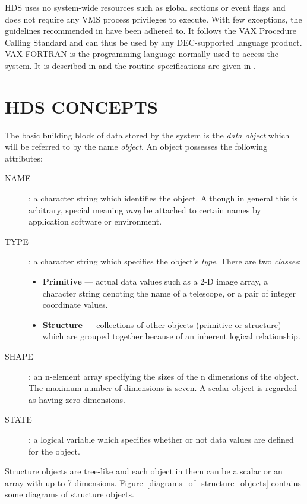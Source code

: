 HDS uses no system-wide resources such as global sections or event flags and
does not require any VMS process privileges to execute. With few exceptions,
the guidelines recommended in \cite{creating_modular_procedures} have been
adhered to. It follows the VAX Procedure Calling Standard and can thus be used
by any DEC-supported language product. VAX FORTRAN is the programming language
normally used to access the system. It is described in
\cite{programming_in_fortran} and the routine specifications are given in
\cite{sun_92}.

\section {HDS CONCEPTS}

The basic building block of data stored by the system is the {\em data object}
which will be referred to by the name {\em object}. An object possesses the
following attributes:

\begin {description}
\item [NAME]: a character string which identifies the object. Although in
general this is arbitrary, special meaning {\em may} be attached to certain
names by application software or environment.
\item [TYPE]: a character string which specifies the object's {\em type}.
There are two {\em classes}:
\begin {itemize}
\item {\bf Primitive} --- actual data values such as a 2-D image array, a
character string denoting the name of a telescope, or a pair of integer
coordinate values.
\item {\bf Structure} --- collections of other objects (primitive or structure)
which are grouped together because of an inherent logical relationship.
\end {itemize}
\item [SHAPE]: an n-element array specifying the sizes of the n dimensions of
the object. The maximum number of dimensions is seven. A scalar object is
regarded as having zero dimensions.
\item [STATE]: a logical variable which specifies whether or not data values
are defined for the object.
\end {description}

Structure objects are tree-like and each object in them can be a scalar or an
array with up to 7 dimensions. Figure~\ref{diagrams_of_structure_objects}
contains some diagrams of structure objects.

